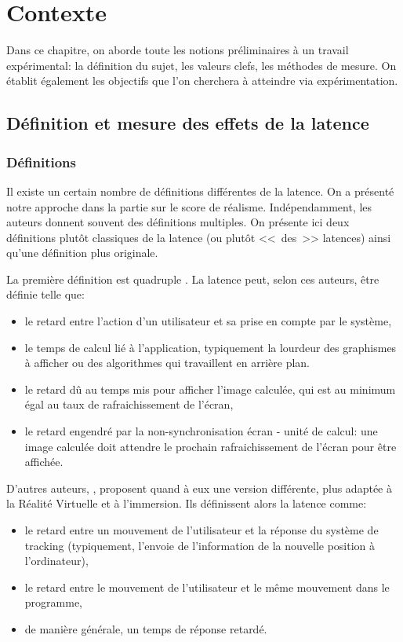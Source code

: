\chapter{Contexte}
	\par Dans ce chapitre, on aborde toute les notions préliminaires à un travail expérimental: la définition du sujet, les valeurs clefs, les méthodes de mesure. On établit également les objectifs que l'on cherchera à atteindre via expérimentation.
	
	\section{Définition et mesure des effets de la latence}
	\subsection{Définitions}	
	\par Il existe un certain nombre de définitions différentes de la latence. On a présenté notre approche dans la partie sur le score de réalisme. Indépendamment, les auteurs donnent souvent des définitions multiples. On présente ici deux définitions plutôt classiques de la latence (ou plutôt <<~des~>> latences) ainsi qu'une définition plus originale.
	
	\par La première définition est quadruple \citep{papadakis_system_2011}. La latence peut, selon ces auteurs, être définie telle que:
	\begin{itemize}
		\item le retard entre l'action d'un utilisateur et sa prise en compte par le système,
		\item le temps de calcul lié à l'application, typiquement la lourdeur des graphismes à afficher ou des algorithmes qui travaillent en arrière plan.
		\item le retard dû au temps mis pour afficher l'image calculée, qui est au minimum égal au taux de rafraichissement de l'écran,
		\item le retard engendré par la non-synchronisation écran - unité de calcul: une image calculée doit attendre le prochain rafraichissement de l'écran pour être affichée.
	\end{itemize}		
	
	\par D'autres auteurs, \citep{hale_handbook_2015}, proposent quand à eux une version différente, plus adaptée à la Réalité Virtuelle et à l'immersion. Ils définissent alors la latence comme:
	\begin{itemize}
		\item le retard entre un mouvement de l'utilisateur et la réponse du système de tracking (typiquement, l'envoie de l'information de la nouvelle position à l'ordinateur),
		\item le retard entre le mouvement de l'utilisateur et le même mouvement dans le programme,
		\item de manière générale, un temps de réponse retardé.
	\end{itemize}		
	
